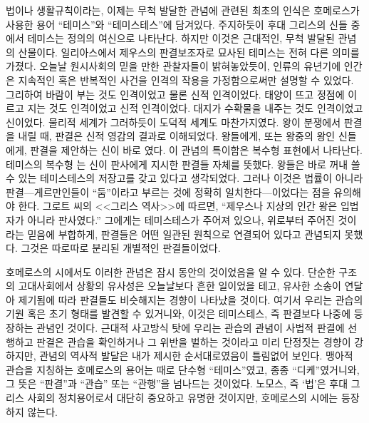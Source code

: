 법이나 생활규칙이라는, 이제는 무척 발달한 관념에 관련된 최초의 인식은
호메로스가 사용한 용어 ``테미스''와
``테미스테스''에 담겨있다.
주지하듯이 후대 그리스의 신들 중에서 테미스는 정의의 여신으로 나타난다.
하지만 이것은 근대적인, 무척 발달된 관념의 산물이다.
일리아스에서 제우스의 판결보조자로 묘사된 테미스는 전혀 다른 의미를 가졌다.
오늘날 원시사회의 믿을 만한 관찰자들이 밝혀놓았듯이,
인류의 유년기에 인간은
지속적인 혹은 반복적인 사건을
인격의 작용을 가정함으로써만
설명할 수 있었다.
그리하여 바람이 부는 것도 인격이었고 물론 신적 인격이었다.
태양이 뜨고 정점에 이르고 지는 것도 인격이었고 신적 인격이었다.
대지가 수확물을 내주는 것도 인격이었고 신이었다.
물리적 세계가 그러하듯이 도덕적 세계도 마찬가지였다.
왕이 분쟁에서 판결을 내릴 때, 판결은 신적 영감의 결과로 이해되었다.
왕들에게, 또는 왕중의 왕인 신들에게, 판결을 제안하는 신이
바로 였다.
이 관념의 특이함은 복수형 표현에서 나타난다.
테미스의 복수형 는 신이 판사에게 지시한
판결들 자체를 뜻했다.
왕들은 바로 꺼내 쓸 수 있는 테미스테스의 저장고를 갖고 있다고 생각되었다.
그러나 이것은 법률이 아니라
판결---게르만인들이 ``둠''이라고 부르는 것에 정확히 일치한다---이었다는
점을 유의해야 한다.
그로트 씨의 <<그리스 역사>>에 따르면,
``제우스나 지상의 인간 왕은 입법자가 아니라 판사였다.''
그에게는 테미스테스가 주어져 있으나,
위로부터 주어진 것이라는 믿음에 부합하게,
판결들은 어떤 일관된 원칙으로 연결되어 있다고 관념되지 못했다.
그것은 따로따로 분리된 개별적인 판결들이었다.

호메로스의 시에서도 이러한 관념은 잠시 동안의 것이었음을 알 수 있다.
단순한 구조의 고대사회에서 상황의 유사성은 오늘날보다 흔한 일이었을 테고,
유사한 소송이 연달아 제기됨에 따라 판결들도 비슷해지는 경향이 나타났을 것이다.
여기서 우리는 관습의 기원 혹은 초기 형태를 발견할 수 있거니와,
이것은 테미스테스, 즉 판결보다 나중에 등장하는 관념인 것이다.
근대적 사고방식 탓에 우리는 관습의 관념이 사법적 판결에 선행하고
판결은 관습을 확인하거나 그 위반을 벌하는 것이라고 미리 단정짓는
경향이 강하지만, 관념의 역사적 발달은 내가 제시한 순서대로였음이
틀림없어 보인다.
맹아적 관습을 지칭하는 호메로스의 용어는 때로 단수형 ``테미스''였고,
종종 ``디케''였거니와, 그 뜻은 ``판결''과 ``관습'' 또는
``관행''을 넘나드는 것이었다.
노모스, 즉 `법'은 후대 그리스 사회의 정치용어로서 대단히 중요하고
유명한 것이지만, 호메로스의 시에는 등장하지 않는다.

